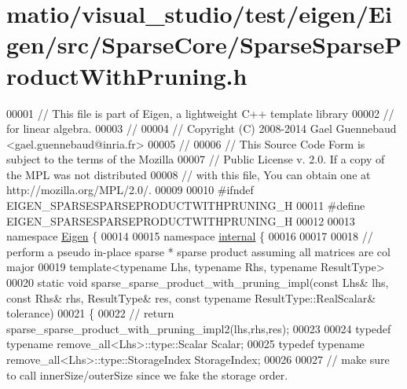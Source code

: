 \hypertarget{matio_2visual__studio_2test_2eigen_2_eigen_2src_2_sparse_core_2_sparse_sparse_product_with_pruning_8h_source}{}\section{matio/visual\+\_\+studio/test/eigen/\+Eigen/src/\+Sparse\+Core/\+Sparse\+Sparse\+Product\+With\+Pruning.h}
\label{matio_2visual__studio_2test_2eigen_2_eigen_2src_2_sparse_core_2_sparse_sparse_product_with_pruning_8h_source}

\begin{DoxyCode}
00001 \textcolor{comment}{// This file is part of Eigen, a lightweight C++ template library}
00002 \textcolor{comment}{// for linear algebra.}
00003 \textcolor{comment}{//}
00004 \textcolor{comment}{// Copyright (C) 2008-2014 Gael Guennebaud <gael.guennebaud@inria.fr>}
00005 \textcolor{comment}{//}
00006 \textcolor{comment}{// This Source Code Form is subject to the terms of the Mozilla}
00007 \textcolor{comment}{// Public License v. 2.0. If a copy of the MPL was not distributed}
00008 \textcolor{comment}{// with this file, You can obtain one at http://mozilla.org/MPL/2.0/.}
00009 
00010 \textcolor{preprocessor}{#ifndef EIGEN\_SPARSESPARSEPRODUCTWITHPRUNING\_H}
00011 \textcolor{preprocessor}{#define EIGEN\_SPARSESPARSEPRODUCTWITHPRUNING\_H}
00012 
00013 \textcolor{keyword}{namespace }\hyperlink{namespace_eigen}{Eigen} \{ 
00014 
00015 \textcolor{keyword}{namespace }\hyperlink{namespaceinternal}{internal} \{
00016 
00017 
00018 \textcolor{comment}{// perform a pseudo in-place sparse * sparse product assuming all matrices are col major}
00019 \textcolor{keyword}{template}<\textcolor{keyword}{typename} Lhs, \textcolor{keyword}{typename} Rhs, \textcolor{keyword}{typename} ResultType>
00020 \textcolor{keyword}{static} \textcolor{keywordtype}{void} sparse\_sparse\_product\_with\_pruning\_impl(\textcolor{keyword}{const} Lhs& lhs, \textcolor{keyword}{const} Rhs& rhs, ResultType& res, \textcolor{keyword}{const} \textcolor{keyword}{
      typename} ResultType::RealScalar& tolerance)
00021 \{
00022   \textcolor{comment}{// return sparse\_sparse\_product\_with\_pruning\_impl2(lhs,rhs,res);}
00023 
00024   \textcolor{keyword}{typedef} \textcolor{keyword}{typename} remove\_all<Lhs>::type::Scalar Scalar;
00025   \textcolor{keyword}{typedef} \textcolor{keyword}{typename} remove\_all<Lhs>::type::StorageIndex StorageIndex;
00026 
00027   \textcolor{comment}{// make sure to call innerSize/outerSize since we fake the storage order.}

\end{DoxyCode}
